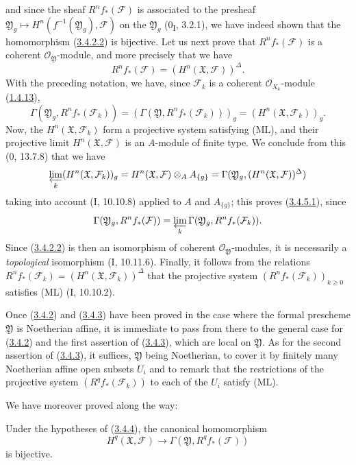 \begin{env}[3.4.5]
and since the sheaf $R^nf_*(\mathcal F)$ is associated to the presheaf
$\mathfrak Y_g\mapsto H^n(f^{-1}(\mathfrak Y_g),\mathcal F)$ on the
$\mathfrak Y_g$ (0\textsubscript{I}, 3.2.1), we have indeed shown that
the homomorphism (\hyperref[III.3.4.2.2]{3.4.2.2}) is bijective. Let us
next prove that $R^nf_*(\mathcal F)$ is a coherent $\mathcal O_{\mathfrak Y}$-module,
and more precisely that we have
\[
R^nf_*(\mathcal F)=(H^n(\mathfrak X,\mathcal F))^\Delta.
\tag{3.4.5.1}\label{III.3.4.5.1}
\]
With the preceding notation, we have, since $\mathcal F_k$ is a coherent
$\mathcal O_{X_k}$-module (\hyperref[III.1.4.13]{1.4.13}),
\[
\Gamma(\mathfrak Y_g,R^nf_*(\mathcal F_k))
=(\Gamma(\mathfrak Y,R^nf_*(\mathcal F_k)))_g
=(H^n(\mathfrak X,\mathcal F_k))_g.
\]
Now, the $H^n(\mathfrak X,\mathcal F_k)$ form a projective system
satisfying (ML), and their projective limit $H^n(\mathfrak X,\mathcal F)$ is
an $A$-module of finite type. We conclude from this (0, 13.7.8) that we have
\[
\varprojlim_k(H^n(\mathfrak X,\mathcal F_k))_g
=H^n(\mathfrak X,\mathcal F)\otimes_AA_{\{g\}}
=\Gamma(\mathfrak Y_g,(H^n(\mathfrak X,\mathcal F))^\Delta)
\]
taking into account (I, 10.10.8) applied to $A$ and $A_{\{g\}}$; this proves
(\hyperref[III.3.4.5.1]{3.4.5.1}), since
\[
\Gamma(\mathfrak Y_g,R^nf_*(\mathcal F))
=\varprojlim_k\Gamma(\mathfrak Y_g,R^nf_*(\mathcal F_k)).
\]
Since (\hyperref[III.3.4.2.2]{3.4.2.2}) is then an isomorphism of coherent
$\mathcal O_{\mathfrak Y}$-modules, it is necessarily a
\emph{topological} isomorphism (I, 10.11.6). Finally, it follows from the relations
$R^nf_*(\mathcal F_k)=(H^n(\mathfrak X,\mathcal F_k))^\Delta$ that the projective
system $(R^nf_*(\mathcal F_k))_{k\geq0}$ satisfies (ML) (I, 10.10.2).

Once (\hyperref[III.3.4.2]{3.4.2}) and
(\hyperref[III.3.4.3]{3.4.3}) have been proved in the case where the formal
prescheme $\mathfrak Y$ is Noetherian affine, it is immediate to pass from there to the
general case for (\hyperref[III.3.4.2]{3.4.2}) and the first assertion of
(\hyperref[III.3.4.3]{3.4.3}), which are local on $\mathfrak Y$. As for
the second assertion of (\hyperref[III.3.4.3]{3.4.3}), it suffices,
$\mathfrak Y$ being Noetherian, to cover it by finitely many Noetherian
affine open subsets $U_i$ and to remark that the restrictions of the projective
system $(R^qf_*(\mathcal F_k))$ to each of the $U_i$ satisfy (ML).
\end{env}

We have moreover proved along the way:

\begin{corollary}[3.4.6]
\label{III.3.4.6}
Under the hypotheses of (\hyperref[III.3.4.4]{3.4.4}), the canonical
homomorphism
\[
H^q(\mathfrak X,\mathcal F)
\longrightarrow\Gamma(\mathfrak Y,R^qf_*(\mathcal F))
\tag{3.4.6.1}\label{III.3.4.6.1}
\]
is bijective.
\end{corollary}

